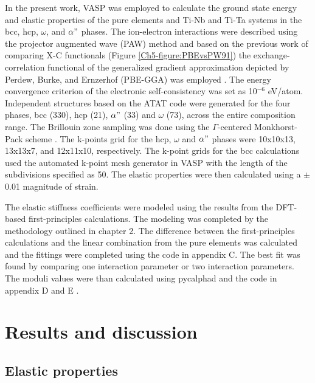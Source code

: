 In the present work, VASP \cite{Kresse1996} was employed to calculate the ground state energy and elastic properties of the pure elements and Ti-Nb and Ti-Ta systems in the bcc, hcp, $\omega$, and $\alpha"$ phases. The ion-electron interactions were described using the projector augmented wave (PAW) \cite{Kresse1999,Blochl1994} method and based on the previous work of comparing X-C functionals (Figure \ref{Ch5-figure:PBEvsPW91}) the exchange-correlation functional of the generalized gradient approximation depicted by Perdew, Burke, and Ernzerhof (PBE-GGA) was employed \cite{Perdew1996a}. The energy convergence criterion of the electronic self-consistency was set as 10$^{-6}$ eV/atom. Independent structures based on the ATAT code \cite{VanDeWalle2002} were generated for the four phases, bcc (330), hcp (21), $\alpha"$ (33) and $\omega$ (73), across the entire composition range. The Brillouin zone sampling was done using the $\Gamma$-centered Monkhorst-Pack scheme \cite{Monkhorst1976a}. The k-points grid for the hcp, $\omega$ and $\alpha"$ phases were 10x10x13, 13x13x7, and 12x11x10, respectively. The k-point grids for the bcc calculations used the automated k-point mesh generator in VASP with the length of the subdivisions specified as 50. The elastic properties were then calculated using a $\pm$0.01 magnitude of strain.

The elastic stiffness coefficients were modeled using the results from the DFT-based first-principles calculations. The modeling was completed by the methodology outlined in chapter 2. The difference between the first-principles calculations and the linear combination from the pure elements was calculated and the fittings were completed using the code in appendix C. The best fit was found by comparing one interaction parameter or two interaction parameters. The moduli values were than calculated using pycalphad and the code in appendix D and E \cite{Otis2017}.

\section{Results and discussion}

\subsection{Elastic properties}

